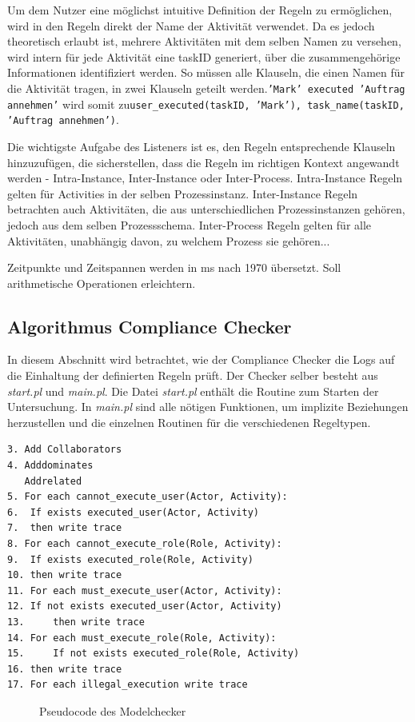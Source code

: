 Um dem Nutzer eine möglichst intuitive Definition der Regeln zu ermöglichen, wird in den Regeln direkt der Name der Aktivität verwendet. Da es jedoch theoretisch erlaubt ist, mehrere Aktivitäten mit dem selben Namen zu versehen, wird intern für jede Aktivität eine taskID generiert, über die zusammengehörige Informationen identifiziert werden. So müssen alle Klauseln, die einen Namen für die Aktivität tragen, in zwei Klauseln geteilt werden.\newline \texttt{'Mark' executed 'Auftrag annehmen'} wird somit zu\newline \texttt{user\_executed(taskID, 'Mark'), task\_name(taskID, 'Auftrag annehmen')}.

Die wichtigste Aufgabe des Listeners ist es, den Regeln entsprechende Klauseln hinzuzufügen, die sicherstellen, dass die Regeln im richtigen Kontext angewandt werden - Intra-Instance, Inter-Instance oder Inter-Process. Intra-Instance Regeln gelten für Activities in der selben Prozessinstanz. Inter-Instance Regeln betrachten auch Aktivitäten, die aus unterschiedlichen Prozessinstanzen gehören, jedoch aus dem selben Prozessschema. Inter-Process Regeln gelten für alle Aktivitäten, unabhängig davon, zu welchem Prozess sie gehören...

Zeitpunkte und Zeitspannen werden in ms nach 1970 übersetzt. Soll arithmetische Operationen erleichtern.

%
%
\subsection{Algorithmus Compliance Checker}
\label{sec:compliancechecker}
In diesem Abschnitt wird betrachtet, wie der Compliance Checker die Logs auf die Einhaltung der definierten Regeln prüft. Der Checker selber besteht aus \textit{start.pl} und \textit{main.pl}. Die Datei \textit{start.pl} enthält die Routine zum Starten der Untersuchung. In \textit{main.pl} sind alle nötigen Funktionen, um implizite Beziehungen herzustellen und die einzelnen Routinen für die verschiedenen Regeltypen.

\begin{verbatim}
3. Add Collaborators
4. Adddominates
   Addrelated
5. For each cannot_execute_user(Actor, Activity): 
6.	If exists executed_user(Actor, Activity) 
7. 	then write trace
8. For each cannot_execute_role(Role, Activity):
9. 	If exists executed_role(Role, Activity)
10.	then write trace
11. For each must_execute_user(Actor, Activity): 
12.	If not exists executed_user(Actor, Activity) 
13. 	then write trace
14. For each must_execute_role(Role, Activity):
15. 	If not exists executed_role(Role, Activity)
16.	then write trace
17. For each illegal_execution write trace
\end{verbatim}
\begin{figure}[!h]
\caption{Pseudocode des Modelchecker}
\label{fig:pseudocode}
\end{figure}

